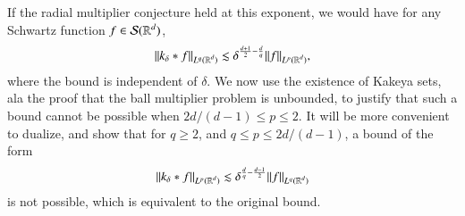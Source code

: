 \begin{comment}
%
\begin{align*}
    k_\delta(|x|) &= 2 \pi |x|^{1 - d/2} \int_{1 - \delta}^{1 + \delta} h \left( \frac{\lambda - 1}{\delta} \right) J_{d/2 - 1}(2 \pi \lambda |x|) \lambda^{d/2}\; d\lambda\\
    &= 2 \pi \delta |x|^{1 - d/2} \int_{-1}^1 h(\lambda) J_{d/2 - 1}(2 \pi (\delta \lambda + 1) |x|) (\delta \lambda + 1)^{d/2}\; d\lambda.
\end{align*}
%
As we have seen, for $s \geq 1$, Bessel function asymptotics tell us that, for any $N > 0$, modulo an error of order $O_N(s^{-N-1/2})$, we can write $J_{d/2-1}(s)$ as a linear combination of terms of the form $s^{-k-1/2} e^{\pm is}$, for $0 \leq k < N-1$. Thus we can write $k_\delta(x)$, modulo an error of order
%
\[ O_N \Bigg( |x|^{- \frac{d-1}{2} - N} \delta^{-1/2-N} \Bigg), \]
%
as a linear combination of terms of the form
%
\[ \delta |x|^{- \frac{d-1}{2} - k} \int_{-1}^1 h(\lambda) (\delta \lambda + 1)^{ \frac{d-1}{2} -k} e^{\pm 2 \pi i (\delta \lambda + 1)}\; d\lambda, \]
%
for $0 \leq k < N-1$. Integrating by parts gives that these terms are, for any $L > 0$,
%
\[ O_L( \delta^{1-L} |x|^{-\frac{d-1}{2} - k - L} ). \]
%
Taking $L$ arbitrarily large gives that
%
\[ \int_{|x| \geq 1/\delta} |k_\delta(x)|^q \lesssim \delta^{q \frac{d+1}{2} - d}. \]
%
For $1 \leq |x| \leq 1/\delta$, we take $L = 0$, which yields that
%
\[ \int_{1 \leq |x| \leq 1/\delta} |k_\delta(x)|^q \lesssim \delta^{q \frac{d+1}{2} - d }. \]
%
Conversely, for $|x| \leq 1$, we use the trivial bound $|k_\delta(x)| \leq \| m_\delta \|_{L^1} \lesssim \delta$. Thus we have
%
\[ \int_{|x| \leq 1} |k_\delta(x)|^q \lesssim \delta^q. \]
%
Putting all these bounds together, together, for $q \geq 2d/(d-1)$ and $\delta \leq 1$, we conclude that
%
\[ \| k_\delta \|_{L^q(\RR^d)} \lesssim \delta^{- \frac{d}{q} + \frac{d+1}{2}}. \]
%
\end{comment}
If the radial multiplier conjecture held at this exponent, we would have for any Schwartz function $f \in \mathcal{S}(\operatorname{\mathbb{R}}^d)$,
%
\[ \| k_\delta * f \|_{L^q(\operatorname{\mathbb{R}}^d)} \lesssim \delta^{\frac{d+1}{2} - \frac{d}{q}} \| f \|_{L^p(\operatorname{\mathbb{R}}^d)}, \]
%
where the bound is independent of $\delta$. We now use the existence of Kakeya sets, ala the proof that the ball multiplier problem is unbounded, to justify that such a bound cannot be possible when $2d/(d-1) \leq p \leq 2$. It will be more convenient to dualize, and show that for $q \geq 2$, and $q \leq p \leq 2d/(d-1)$, a bound of the form
%
\[ \| k_\delta * f \|_{L^p(\operatorname{\mathbb{R}}^d)} \lesssim \delta^{\frac{d}{q} - \frac{d-1}{2}} \| f \|_{L^q(\operatorname{\mathbb{R}}^d)} \]
%
is not possible, which is equivalent to the original bound.

